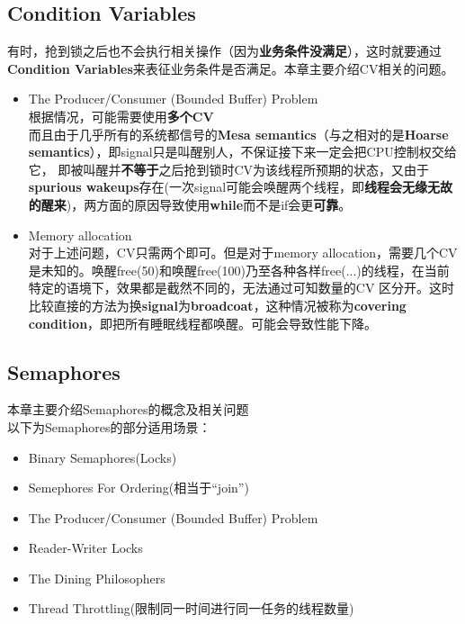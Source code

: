 \documentclass{article}
\begin{document}
\subsection{Condition Variables}
有时，抢到锁之后也不会执行相关操作（因为\textbf{业务条件没满足}），这时就要通过\textbf{Condition Variables}来表征业务条件是否满足。本章主要介绍CV相关的问题。
\begin{itemize}
    \item The Producer/Consumer (Bounded Buffer) Problem\\
    根据情况，可能需要使用\textbf{多个CV} \\
    而且由于几乎所有的系统都信号的\textbf{Mesa semantics}（与之相对的是\textbf{Hoarse semantics}），即signal只是叫醒别人，不保证接下来一定会把CPU控制权交给它，
    即被叫醒并\textbf{不等于}之后抢到锁时CV为该线程所预期的状态，又由于\textbf{spurious wakeups}存在(一次signal可能会唤醒两个线程，即\textbf{线程会无缘无故的醒来})，两方面的原因导致使用\textbf{while}而不是if会更\textbf{可靠}。
    \item Memory allocation \\
    对于上述问题，CV只需两个即可。但是对于memory allocation，需要几个CV是未知的。唤醒free(50)和唤醒free(100)乃至各种各样free(...)的线程，在当前特定的语境下，效果都是截然不同的，无法通过可知数量的CV
    区分开。这时比较直接的方法为换\textbf{signal}为\textbf{broadcoat}，这种情况被称为\textbf{covering condition}，即把所有睡眠线程都唤醒。可能会导致性能下降。
\end{itemize}
\subsection{Semaphores}
本章主要介绍Semaphores的概念及相关问题 \\
以下为Semaphores的部分适用场景：
\begin{itemize}
    \item Binary Semaphores(Locks)
    \item Semephores For Ordering(相当于“join”)
    \item The Producer/Consumer (Bounded Buffer) Problem 
    \item Reader-Writer Locks
    \item The Dining Philosophers
    \item Thread Throttling(限制同一时间进行同一任务的线程数量)
\end{itemize}
\end{document}
